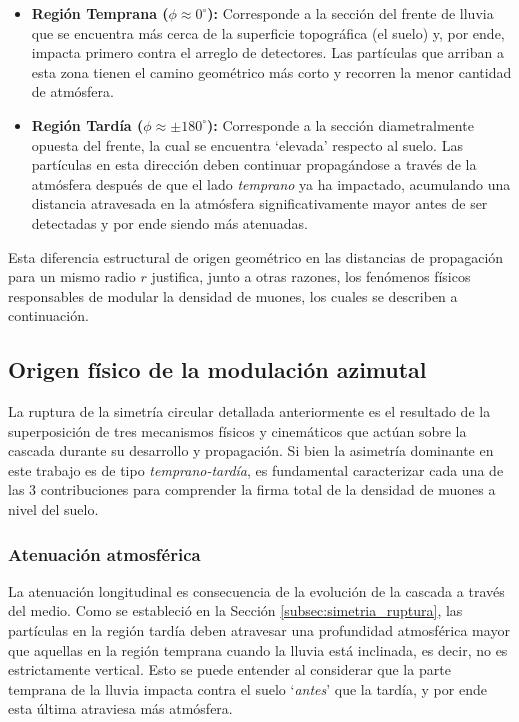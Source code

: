 \begin{itemize}
	\item \textbf{Región Temprana ($\phi \approx 0^\circ$):} Corresponde a la sección del frente de lluvia que se encuentra más cerca de la superficie topográfica (el suelo) y, por ende, impacta primero contra el arreglo de detectores. Las partículas que arriban a esta zona tienen el camino geométrico más corto y recorren la menor cantidad de atmósfera.
	\item \textbf{Región Tardía ($\phi \approx \pm 180^\circ$):} Corresponde a la sección diametralmente opuesta del frente, la cual se encuentra `elevada' respecto al suelo. Las partículas en esta dirección deben continuar propagándose a través de la atmósfera después de que el lado \textit{temprano} ya ha impactado, acumulando una distancia atravesada en la atmósfera significativamente mayor antes de ser detectadas y por ende siendo más atenuadas.
\end{itemize}

Esta diferencia estructural de origen geométrico en las distancias de propagación para un mismo radio $r$ justifica, junto a otras razones, los fenómenos físicos responsables de modular la densidad de muones, los cuales se describen a continuación.

\subsection{Origen físico de la modulación azimutal}
\label{subsec:origen_fisico}

La ruptura de la simetría circular detallada anteriormente es el resultado de la superposición de tres mecanismos físicos y cinemáticos que actúan sobre la cascada durante su desarrollo y propagación. Si bien la asimetría dominante en este trabajo es de tipo \textit{temprano-tardía}, es fundamental caracterizar cada una de las 3 contribuciones \cite{GAP2007_124} para comprender la firma total de la densidad de muones a nivel del suelo.

\subsubsection{Atenuación atmosférica}
\label{subsubsec:atenuacion}

La atenuación longitudinal es consecuencia de la evolución de la cascada a través del medio. Como se estableció en la Sección \ref{subsec:simetria_ruptura}, las partículas en la región tardía deben atravesar una profundidad atmosférica mayor que aquellas en la región temprana cuando la lluvia está inclinada, es decir, no es estrictamente vertical. Esto se puede entender al considerar que la parte temprana de la lluvia impacta contra el suelo `\textit{antes}' que la tardía, y por ende esta última atraviesa más atmósfera.

